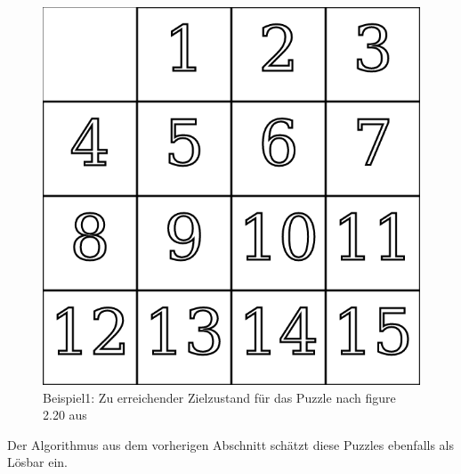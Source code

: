 \begin{minipage}{\linewidth}
\begin{minipage}[t]{0.45\linewidth}
\begin{figure}[H]
			\includegraphics[width=\linewidth,keepaspectratio]{img/End_Puzzle_Stroetmann.png}
			\captionsetup{format=plain, indention=0pt}
			\caption{\label{fig:Ex1_end}Beispiel1: Zu erreichender Zielzustand für das Puzzle nach figure 2.20 aus \autocite{github-stroetmann:online}}
		\end{figure}
	\end{minipage}
\end{minipage}\WNL%
Der Algorithmus aus dem vorherigen Abschnitt schätzt diese Puzzles ebenfalls als Lösbar ein.\\
